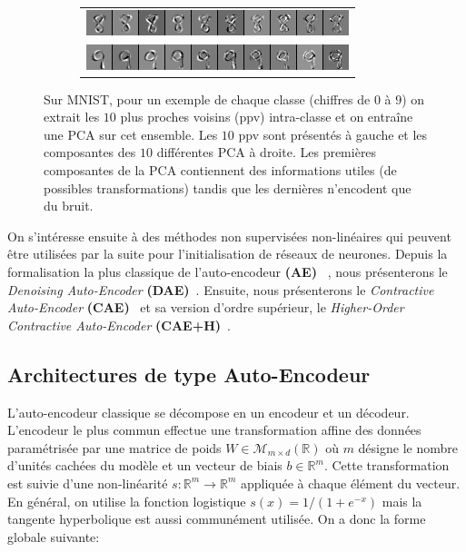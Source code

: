 \begin{figure}
\begin{subfigure}{0.45\textwidth}
\begin{tabular}{c}
  \includegraphics[width=0.90\linewidth]{predoc/images/8_eigenvectors.png}\\
  \includegraphics[width=0.90\linewidth]{predoc/images/9_eigenvectors.png}
\end{tabular}
\end{subfigure}

   \caption[Vecteurs propres d'une PCA sur les 10-ppv de classes de MNIST]{Sur MNIST, pour un exemple de chaque classe (chiffres de $0$ à $9$) on
   extrait les $10$ plus proches voisins (ppv) intra-classe et on entraîne une PCA sur cet
   ensemble. Les $10$ ppv sont présentés à gauche et les
   composantes des $10$ différentes PCA à droite. Les premières composantes de
   la PCA contiennent des informations utiles (de possibles transformations)
   tandis que les dernières n'encodent que du bruit.}

\label{fig:mnistpca}
\end{figure}


On s'intéresse ensuite à des méthodes non supervisées non-linéaires qui peuvent être utilisées par la suite pour
l'initialisation de réseaux de neurones.
Depuis la formalisation la plus classique de l'auto-encodeur
\textbf{(AE)}~\citep{Gallinari87} , nous présenterons le \textit{Denoising
Auto-Encoder} \textbf{(DAE)}~\citep{VincentPLarochelleH2008,Vincent-JMLR-2010}.
Ensuite, nous présenterons le \textit{Contractive Auto-Encoder}
\textbf{(CAE)}~\citep{Rifai+al-2011} et sa version d'ordre supérieur,
le \textit{Higher-Order Contractive Auto-Encoder}
\textbf{(CAE+H)}~\citep{Salah+al-2011}.

\subsection{Architectures de type Auto-Encodeur}

L'auto-encodeur classique se décompose en un encodeur et un décodeur.
L'encodeur le plus commun effectue une transformation affine des données paramétrisée par une
matrice de poids $W\in\mathcal{M}_{m\times d}(\mathbb{R})$ où $m$ désigne le
nombre d'unités cachées du modèle et un vecteur de biais $b\in\mathbb{R}^m$.
Cette transformation est suivie d'une non-linéarité $s:\mathbb{R}^m \rightarrow
\mathbb{R}^m$ appliquée à chaque élément du vecteur. En général, on utilise la
fonction logistique $s(x)=1/(1+e^{-x})$ mais la tangente hyperbolique est aussi
communément utilisée. On a donc la forme globale suivante:

